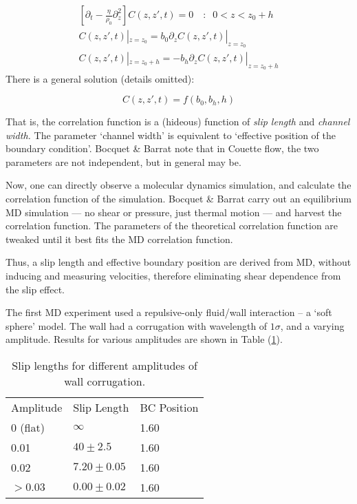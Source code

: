 \documentclass[12pt, a4paper, twoside, openright]{book}
\begin{document}
\begin{gather}
\left[ \partial_{t} - \frac{\eta}{\rho_{0}} \partial_{z}^{2} \right]
C(z,z',t) = 0 \quad :\;\; 0<z<z_{0}+h 
\\
C(z,z',t)|_{z=z_{0}} = b_{0} \partial_{z} C(z,z',t)|_{z=z_{0}}
\\
C(z,z',t)|_{z=z_{0}+h} = -b_{h} \partial_{z} C(z,z',t)|_{z=z_{0}+h}
\end{gather}
There is a general solution (details omitted):

\begin{equation}
C(z,z',t) = f(b_{0}, b_{h}, h)
\end{equation}

That is, the correlation function is a (hideous) function of \emph{slip length} and \emph{channel width.} The parameter `channel width' is equivalent to `effective position of the boundary condition'.  Bocquet \& Barrat note that in Couette flow, the two parameters are not independent, but in general may be.

Now, one can directly observe a molecular dynamics simulation, and calculate the correlation function of the simulation. Bocquet \& Barrat carry out an equilibrium MD simulation --- no shear or pressure, just thermal motion --- and harvest the correlation function.  The parameters of the theoretical correlation function are tweaked until it best fits the MD correlation function.

Thus, a slip length and effective boundary position are derived from MD, without inducing and measuring velocities, therefore eliminating  shear dependence from the slip effect.

The first MD experiment used a repulsive-only fluid/wall interaction -- a `soft sphere' model. The wall had a corrugation with wavelength of $1 \sigma$, and a varying amplitude.  Results for various amplitudes are shown in Table (\ref{t2}).


\begin{table}[h]
\centering
\caption{Slip lengths for different amplitudes of wall corrugation.} \label{t2}
\begin{tabular}{lll}
Amplitude      & Slip Length      & BC Position \\
0  (flat)      & $\infty$         & 1.60 \\
0.01           & $40 \pm 2.5$     & 1.60 \\
0.02           & $7.20 \pm 0.05$  & 1.60 \\
$>0.03$        & $0.00 \pm 0.02$  & 1.60 \\
\end{tabular}
\end{table}
\end{document}
